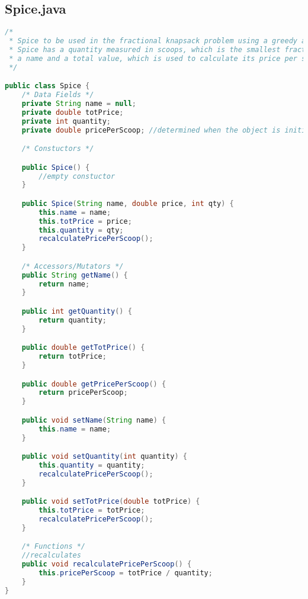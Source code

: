 \documentclass[letterpaper, 10pt,DIV=13]{scrartcl}
\numberwithin{equation}{section} %
\numberwithin{figure}{section} %
\numberwithin{table}{section} %
\begin{document}
\subsection{Spice.java}
\begin{lstlisting}[frame=single, language=java, breaklines]  
/*
 * Spice to be used in the fractional knapsack problem using a greedy algorithm. Spice is the object being added to the knapsacks.
 * Spice has a quantity measured in scoops, which is the smallest fraction that the spice can be separated into. The spice also has 
 * a name and a total value, which is used to calculate its price per scoop.
 */

public class Spice {
    /* Data Fields */
    private String name = null;
    private double totPrice;
    private int quantity;
    private double pricePerScoop; //determined when the object is initialized

    /* Constuctors */

    public Spice() {
        //empty constuctor
    }

    public Spice(String name, double price, int qty) {
        this.name = name;
        this.totPrice = price;
        this.quantity = qty;
        recalculatePricePerScoop();
    }

    /* Accessors/Mutators */
    public String getName() {
        return name;
    }

    public int getQuantity() {
        return quantity;
    }

    public double getTotPrice() {
        return totPrice;
    }

    public double getPricePerScoop() {
        return pricePerScoop;
    }

    public void setName(String name) {
        this.name = name;
    }

    public void setQuantity(int quantity) {
        this.quantity = quantity;
        recalculatePricePerScoop();
    }

    public void setTotPrice(double totPrice) {
        this.totPrice = totPrice;
        recalculatePricePerScoop();
    }

    /* Functions */
    //recalculates
    public void recalculatePricePerScoop() {
        this.pricePerScoop = totPrice / quantity;
    }
}
\end{lstlisting}
\end{document}
